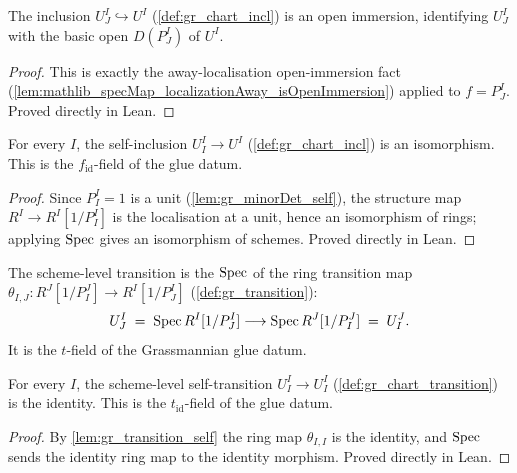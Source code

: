 \begin{lemma}\leanok
  \label{lem:gr_chartIncl_isOpenImmersion}
  The inclusion \(U^I_J \hookrightarrow U^I\) (\cref{def:gr_chart_incl}) is an
  open immersion, identifying \(U^I_J\) with the basic open \(D(P^I_J)\) of
  \(U^I\).
\end{lemma}
\begin{proof}
  \leanok
  This is exactly the away-localisation open-immersion fact
  (\cref{lem:mathlib_specMap_localizationAway_isOpenImmersion}) applied to
  \(f = P^I_J\). Proved directly in Lean.
\end{proof}

\begin{lemma}\leanok
  \label{lem:gr_chartIncl_self_isIso}
  For every \(I\), the self-inclusion \(U^I_I \to U^I\) (\cref{def:gr_chart_incl})
  is an isomorphism. This is the \(f_{\mathrm{id}}\)-field of the glue datum.
\end{lemma}
\begin{proof}
  \leanok
  Since \(P^I_I = 1\) is a unit (\cref{lem:gr_minorDet_self}), the structure map
  \(R^I \to R^I[1/P^I_I]\) is the localisation at a unit, hence an isomorphism of
  rings; applying \(\operatorname{Spec}\) gives an isomorphism of schemes. Proved directly in
  Lean.
\end{proof}

\begin{definition}\leanok
  \label{def:gr_chart_transition}
  The scheme-level transition is the \(\operatorname{Spec}\) of the ring transition map
  \(\theta_{I,J} : R^J[1/P^J_I] \to R^I[1/P^I_J]\) (\cref{def:gr_transition}):
  \[
    U^I_J \;=\; \operatorname{Spec} R^I[1/P^I_J] \longrightarrow \operatorname{Spec} R^J[1/P^J_I] \;=\; U^J_I .
  \]
  It is the \(t\)-field of the Grassmannian glue datum.
\end{definition}

\begin{lemma}\leanok
  \label{lem:gr_chartTransition_self}
  For every \(I\), the scheme-level self-transition
  \(U^I_I \to U^I_I\) (\cref{def:gr_chart_transition}) is the identity. This is
  the \(t_{\mathrm{id}}\)-field of the glue datum.
\end{lemma}
\begin{proof}
  \leanok
  By \cref{lem:gr_transition_self} the ring map \(\theta_{I,I}\) is the identity,
  and \(\operatorname{Spec}\) sends the identity ring map to the identity morphism. Proved
  directly in Lean.
\end{proof}

